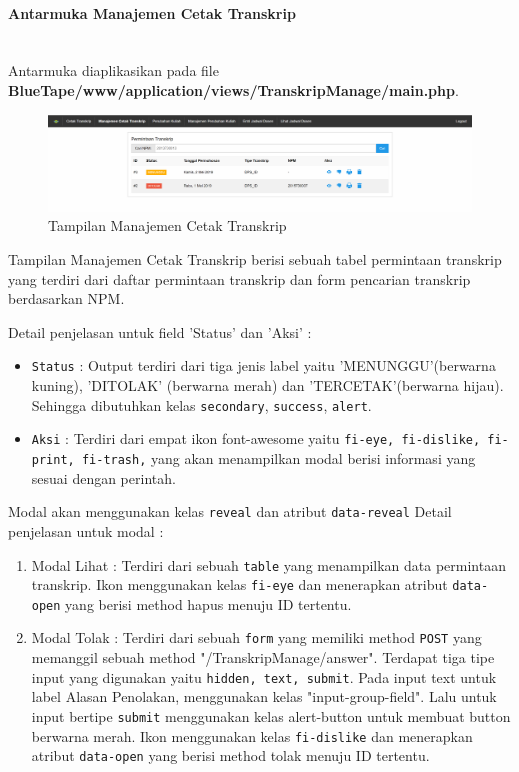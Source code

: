 \documentclass[a4paper,twoside]{article}
\newcommand{\myparagraph}[1]{\paragraph{#1}\mbox{}\\}
\begin{document}
\begin{enumerate}
		\myparagraph{Antarmuka Manajemen Cetak Transkrip}
		Antarmuka diaplikasikan pada file \textbf{BlueTape/www/application/views/TranskripManage/main.php}.
		\begin{figure} [H]
			\centering  
			\includegraphics[scale=0.5]{Tampilan-Manajemen-Cetak-Transkrip.png}  
			\caption{Tampilan Manajemen Cetak Transkrip} 	
		\end{figure}
		
		Tampilan Manajemen Cetak Transkrip berisi sebuah tabel permintaan transkrip yang terdiri dari daftar permintaan transkrip dan form pencarian transkrip berdasarkan NPM. \par
		
		\noindent Detail penjelasan untuk field 'Status' dan 'Aksi' :
		\begin{itemize}
			\item \texttt{Status} : Output terdiri dari tiga jenis label yaitu 'MENUNGGU'(berwarna kuning), 'DITOLAK' (berwarna merah) dan 'TERCETAK'(berwarna hijau).  Sehingga dibutuhkan kelas \colorbox{mygray}{\verb|secondary|}, \colorbox{mygray}{\verb|success|}, \colorbox{mygray}{\verb|alert|}. 
			\item \texttt{Aksi} : Terdiri dari empat ikon font-awesome yaitu \verb|fi-eye, fi-dislike, fi-print, fi-trash,| yang akan menampilkan modal berisi informasi yang sesuai dengan perintah.
		\end{itemize}
		Modal akan menggunakan kelas \texttt{reveal} dan atribut \texttt{data-reveal} Detail penjelasan untuk modal : 
		
		\begin{enumerate}
			
			\item Modal Lihat : Terdiri dari sebuah \texttt{table} yang menampilkan data permintaan transkrip. Ikon menggunakan kelas \texttt{fi-eye} dan menerapkan atribut \texttt{data-open} yang berisi method hapus menuju ID tertentu.
			
			\item Modal Tolak : Terdiri dari sebuah \texttt{form} yang memiliki method \texttt{POST} yang memanggil sebuah method "/TranskripManage/answer". Terdapat tiga tipe input yang digunakan yaitu \texttt{hidden, text, submit}. Pada input text untuk label Alasan Penolakan, menggunakan kelas "input-group-field". Lalu untuk input bertipe \texttt{submit} menggunakan kelas alert-button untuk membuat button berwarna merah. Ikon menggunakan kelas \texttt{fi-dislike} dan menerapkan atribut \texttt{data-open} yang berisi method tolak menuju ID tertentu.
			

\end{enumerate}
\end{enumerate}
\end{document}
